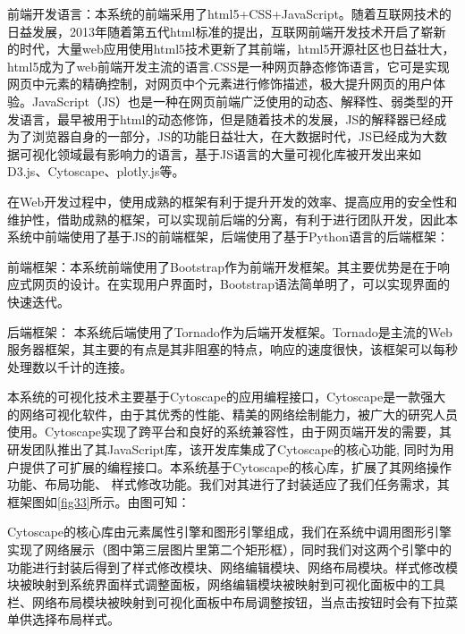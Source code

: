 前端开发语言：本系统的前端采用了html5+CSS+JavaScript。随着互联网技术的日益发展，2013年随着第五代html标准的提出，互联网前端开发技术开启了崭新的时代，大量web应用使用html5技术更新了其前端，html5开源社区也日益壮大，html5成为了web前端开发主流的语言.CSS是一种网页静态修饰语言，它可是实现网页中元素的精确控制，对网页中个元素进行修饰描述，极大提升网页的用户体验。JavaScript（JS）也是一种在网页前端广泛使用的动态、解释性、弱类型的开发语言，最早被用于html的动态修饰，但是随着技术的发展，JS的解释器已经成为了浏览器自身的一部分，JS的功能日益壮大，在大数据时代，JS已经成为大数据可视化领域最有影响力的语言，基于JS语言的大量可视化库被开发出来如D3.js、Cytoscape、plotly.js等。

在Web开发过程中，使用成熟的框架有利于提升开发的效率、提高应用的安全性和维护性，借助成熟的框架，可以实现前后端的分离，有利于进行团队开发，因此本系统中前端使用了基于JS的前端框架，后端使用了基于Python语言的后端框架：

前端框架：本系统前端使用了Bootstrap作为前端开发框架。其主要优势是在于响应式网页的设计。在实现用户界面时，Bootstrap语法简单明了，可以实现界面的快速迭代。

后端框架： 本系统后端使用了Tornado作为后端开发框架。Tornado是主流的Web服务器框架，其主要的有点是其非阻塞的特点，响应的速度很快，该框架可以每秒处理数以千计的连接。


本系统的可视化技术主要基于Cytoscape的应用编程接口，Cytoscape是一款强大的网络可视化软件，由于其优秀的性能、精美的网络绘制能力，被广大的研究人员使用。Cytoscape实现了跨平台和良好的系统兼容性，由于网页端开发的需要，其研发团队推出了其JavaScript库，该开发库集成了Cytoscape的核心功能, 同时为用户提供了可扩展的编程接口。本系统基于Cytoscape的核心库，扩展了其网络操作功能、布局功能、 样式修改功能。我们对其进行了封装适应了我们任务需求，其框架图如\ref{fig33}所示。由图可知：


Cytoscape的核心库由元素属性引擎和图形引擎组成，我们在系统中调用图形引擎实现了网络展示（图中第三层图片里第二个矩形框），同时我们对这两个引擎中的功能进行封装后得到了样式修改模块、网络编辑模块、网络布局模块。样式修改模块被映射到系统界面样式调整面板，网络编辑模块被映射到可视化面板中的工具栏、网络布局模块被映射到可视化面板中布局调整按钮，当点击按钮时会有下拉菜单供选择布局样式。

